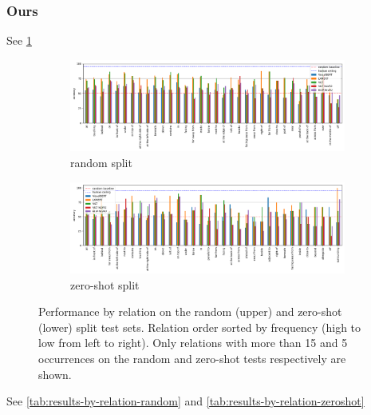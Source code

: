 \subsubsection{Ours}

See \cref{fig:performance_by_rel}

\begin{figure}[ht]
    \centering
\begin{subfigure}[b]{\linewidth}
    \centering
    \includegraphics[width=\linewidth]{images/visual-spatial-reasoning/performance_rel_random.png}
    \vspace{-1cm}
    \caption{random split}
\end{subfigure}
\begin{subfigure}[b]{\linewidth}
    \centering
    \includegraphics[width=\linewidth]{images/visual-spatial-reasoning/performance_rel_zeroshot.png}
    \vspace{-1cm}
    \caption{zero-shot split}
\end{subfigure}
\caption{Performance by relation on the random (upper) and zero-shot (lower) split test sets. Relation order sorted by frequency (high to low from left to right). Only relations with more than 15 and 5 occurrences on the random and zero-shot tests respectively are shown. }
    \label{fig:performance_by_rel}
\end{figure}

See \cref{tab:results-by-relation-random} and \cref{tab:results-by-relation-zeroshot}


